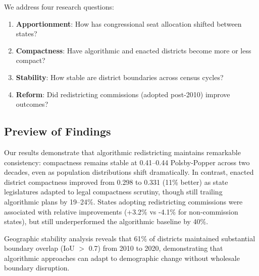 We address four research questions:
\begin{enumerate}
    \item \textbf{Apportionment}: How has congressional seat allocation shifted between states?
    \item \textbf{Compactness}: Have algorithmic and enacted districts become more or less compact?
    \item \textbf{Stability}: How stable are district boundaries across census cycles?
    \item \textbf{Reform}: Did redistricting commissions (adopted post-2010) improve outcomes?
\end{enumerate}

\subsection{Preview of Findings}

Our results demonstrate that algorithmic redistricting maintains remarkable consistency: compactness remains stable at 0.41--0.44 Polsby-Popper across two decades, even as population distributions shift dramatically. In contrast, enacted district compactness improved from 0.298 to 0.331 (11\% better) as state legislatures adapted to legal compactness scrutiny, though still trailing algorithmic plans by 19--24\%. States adopting redistricting commissions were associated with relative improvements (+3.2\% vs -4.1\% for non-commission states), but still underperformed the algorithmic baseline by 40\%.

Geographic stability analysis reveals that 61\% of districts maintained substantial boundary overlap (IoU $>$ 0.7) from 2010 to 2020, demonstrating that algorithmic approaches can adapt to demographic change without wholesale boundary disruption.
